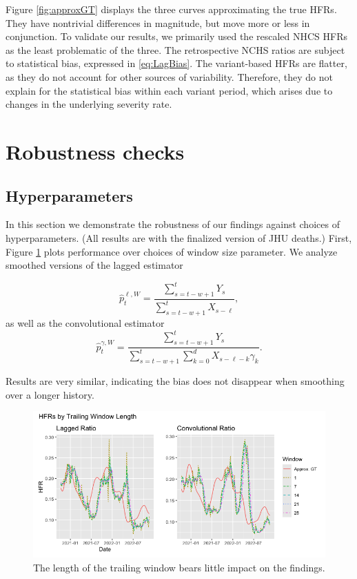 \documentclass{article}
\begin{document}
Figure \ref{fig:approxGT} displays the three curves approximating the true HFRs. They have nontrivial differences in magnitude, but move more or less in conjunction. To validate our results, we primarily used the rescaled NHCS HFRs as the least problematic of the three. The retrospective NCHS ratios are subject to statistical bias, expressed in \ref{eq:LagBias}. The variant-based HFRs are flatter, as they do not account for other sources of variability. Therefore, they do not explain for the statistical bias within each variant period, which arises due to changes in the underlying severity rate.  %

\section{Robustness checks}\label{apx:robustness}
\subsection{Hyperparameters}
In this section we demonstrate the robustness of our findings against choices of hyperparameters. (All results are with the finalized version of JHU deaths.) First, Figure \ref{fig:window} plots performance over choices of window size parameter. We analyze smoothed versions of the lagged estimator

\begin{equation}\label{eq:laggedSmooth}
    \hat{p}_t^{\ell, W} = \frac{\sum_{s=t-w+1}^{t} Y_s}{\sum_{s=t-w+1}^{t} X_{s-\ell}},
\end{equation}
\noindent as well as the convolutional estimator
\begin{equation}\label{eq:convSmooth}
    \hat{p}_t^{\gamma, W} = \frac{\sum_{s=t-w+1}^{t} Y_s}{\sum_{s=t-w+1}^{t} \sum_{k=0}^d X_{s-\ell-k}\gamma_k}.
\end{equation}

\noindent Results are very similar, indicating the bias does not disappear when smoothing over a longer history. 

\begin{figure}
    \centering
    \includegraphics[width=0.75\linewidth]{Figs/window_size.png}
    \caption{The length of the trailing window bears little impact on the findings.}
    \label{fig:window}
\end{figure}
\end{document}
